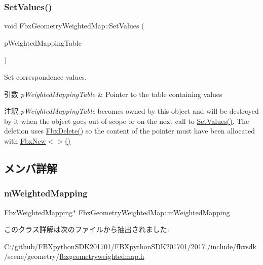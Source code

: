 \subsubsection{\texorpdfstring{Set\+Values()}{SetValues()}}
{\footnotesize\ttfamily void Fbx\+Geometry\+Weighted\+Map\+::\+Set\+Values (\begin{DoxyParamCaption}\item[{const \hyperlink{class_fbx_weighted_mapping}{Fbx\+Weighted\+Mapping} $\ast$}]{p\+Weighted\+Mapping\+Table }\end{DoxyParamCaption})}

Set correspondence values. 
\begin{DoxyParams}{引数}
{\em p\+Weighted\+Mapping\+Table} & Pointer to the table containing values \\
\hline
\end{DoxyParams}
\begin{DoxyRemark}{注釈}
{\itshape p\+Weighted\+Mapping\+Table} becomes owned by this object and will be destroyed by it when the object goes out of scope or on the next call to \hyperlink{class_fbx_geometry_weighted_map_a42bb06040581c024f72d39e6a4318f4f}{Set\+Values()}. The deletion uses \hyperlink{fbxalloc_8h_a55138f34ac93c519a78f624178c128d6}{Fbx\+Delete()} so the content of the pointer must have been allocated with \hyperlink{fbxnew_8h_a31302f981355f4b48ebc963ead1434f2}{Fbx\+New$<$$>$()} 
\end{DoxyRemark}


\subsection{メンバ詳解}
\mbox{\label{class_fbx_geometry_weighted_map_a2d36d5ffef5895fb3faa75378884b32d}} 
\subsubsection{\texorpdfstring{m\+Weighted\+Mapping}{mWeightedMapping}}
{\footnotesize\ttfamily \hyperlink{class_fbx_weighted_mapping}{Fbx\+Weighted\+Mapping}$\ast$ Fbx\+Geometry\+Weighted\+Map\+::m\+Weighted\+Mapping\hspace{0.3cm}{\ttfamily [protected]}}



このクラス詳解は次のファイルから抽出されました\+:\begin{DoxyCompactItemize}
\item 
C\+:/github/\+F\+B\+Xpython\+S\+D\+K201701/\+F\+B\+Xpython\+S\+D\+K201701/2017./include/fbxsdk/scene/geometry/\hyperlink{fbxgeometryweightedmap_8h}{fbxgeometryweightedmap.\+h}\end{DoxyCompactItemize}
